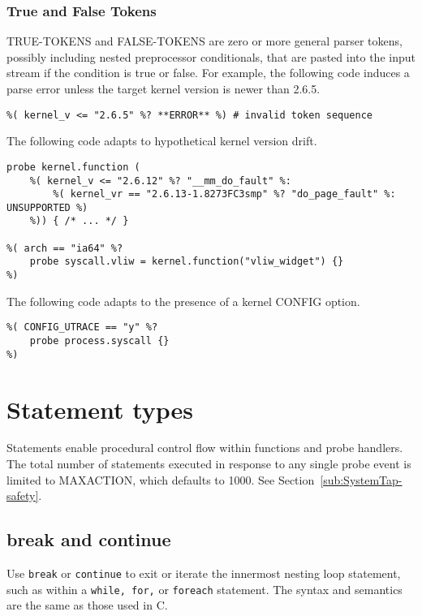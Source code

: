 \documentclass[twoside,english]{article}
\newenvironment{vindent}
{\begin{list}{}{\setlength{\listparindent}{6pt}}
\item[]}
{\end{list}}
\begin{document}
\subsubsection{True and False Tokens}
TRUE-TOKENS and FALSE-TOKENS are zero or more general parser tokens, possibly
including nested preprocessor conditionals, that are pasted into the input
stream if the condition is true or false. For example, the following code
induces a parse error unless the target kernel version is newer than 2.6.5.

\begin{vindent}
\begin{verbatim}
%( kernel_v <= "2.6.5" %? **ERROR** %) # invalid token sequence
\end{verbatim}
\end{vindent}
The following code adapts to hypothetical kernel version drift.

\begin{vindent}
\begin{verbatim}
probe kernel.function (
    %( kernel_v <= "2.6.12" %? "__mm_do_fault" %:
        %( kernel_vr == "2.6.13-1.8273FC3smp" %? "do_page_fault" %: UNSUPPORTED %)
    %)) { /* ... */ }

%( arch == "ia64" %?
    probe syscall.vliw = kernel.function("vliw_widget") {}
%)

\end{verbatim}
\end{vindent}

The following code adapts to the presence of a kernel CONFIG option.

\begin{vindent}
\begin{verbatim}
%( CONFIG_UTRACE == "y" %?
    probe process.syscall {}
%)
\end{verbatim}
\end{vindent}

\section{Statement types\label{sec:Statement-Types}}

Statements enable procedural control flow within functions and probe handlers.
The total number of statements executed in response to any single probe event
is limited to MAXACTION, which defaults to 1000. See Section~\ref{sub:SystemTap-safety}.


\subsection{break and continue}
Use \texttt{break} or \texttt{continue} to exit or iterate the innermost
nesting loop statement, such as within a \texttt{while, for,} or \texttt{foreach}
statement. The syntax and semantics are the same as those used in C.
\end{document}
